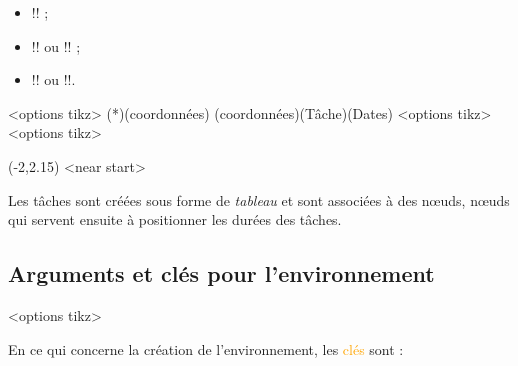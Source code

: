 \documentclass[french,a4paper,11pt]{article}
\newcommand\Cle[1]{{\small\sffamily\textlangle \textcolor{orange}{#1}\textrangle}}
\begin{document}
{{\begin{cautionblock}
\begin{itemize}
	\item \motcletex!\MPMPlaceNotice! ;
	\item \motcletex!\MPMPlaceTache! ou \motcletex!\MPMPlaceTaches! ;
	\item \motcletex!\MPMPlaceDuree! ou \motcletex!\MPMPlaceDurees!.
\end{itemize}
\vspace*{-\baselineskip}\leavevmode
\end{cautionblock}

\begin{DemoCode}
\begin{GrapheMPM}[clés]<options tikz>
	\MPMPlaceNotice(*)(coordonnées)
	\MPMPlaceTache(coordonnées)(Tâche)(Dates)
	<options tikz>
	<options tikz>
\end{GrapheMPM}
\end{DemoCode}

\begin{DemoCode}[]
\begin{GrapheMPM}
	\MPMPlaceNotice(-2,2.15)
	<near start>
\end{GrapheMPM}
\end{DemoCode}

\begin{tipblock}
Les tâches sont créées sous forme de \textit{tableau} et sont associées à des nœuds, nœuds qui servent ensuite à positionner les durées des tâches.
\end{tipblock}

\pagebreak

\subsection{Arguments et clés pour l'environnement}

\begin{DemoCode}
\begin{GrapheMPM}[clés]<options tikz>
\end{GrapheMPM}
\end{DemoCode}

\begin{tipblock}
En ce qui concerne la création de l'environnement, les \Cle{clés} sont :


\end{tipblock}}}
\end{document}
